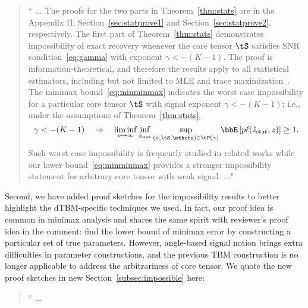\documentclass[11pt]{article}
\theoremstyle{definition}
\theoremstyle{definition}
\begin{document}
\begin{enumerate}
\begin{enumerate}[wide]
    \begin{quote}
        `` ...
        The proofs for the two parts in Theorem~\ref{thm:stats} are in the Appendix II, Section~\ref{sec:statprove1} and Section~\ref{sec:statprove2}, respectively. The first part of Theorem~\ref{thm:stats} demonstrates impossibility of exact recovery whenever the core tensor $\tS$ satisfies SNR condition~\eqref{eq:gamma} with exponent $\gamma < -(K-1)$. The proof is information-theoretical, and therefore the results apply to all statistical estimators, including but not limited to MLE and trace maximization~\citep{ghoshdastidar2017uniform}. The minimax bound~\eqref{eq:minminmax} indicates the worst case impossibility for a particular core tensor $\tS$ with signal exponent $\gamma < -(K-1)$; i.e., under the assumptions of Theorem~\ref{thm:stats}, 
\begin{equation}
    \gamma < -(K-1) \quad \Rightarrow \quad \liminf_{p \rightarrow \infty}  \inf_{\hat z_{\text{stat}}}\sup_{ (z,\tS, \mtheta) \in \tP(\gamma)} \bbE \left[ p\ell(\hat z_{\text{stat}}, z) \right]\geq 1.
\end{equation}
Such worst case impossibility is frequently studied in related works \citep{han2020exact, gao2018community} while our lower bound~\eqref{eq:minminmax} provides a stronger impossibility statement for arbitrary core tensor with weak signal.   ..."
    \end{quote}
    
    Second, we have added proof sketches for the impossibility results to better highlight the dTBM-specific techniques we used. In fact, our proof idea is common in minimax analysis and shares the same spirit with reviewer's proof idea in the comment: find the lower bound of minimax error by constructing a particular set of true parameters. However, angle-based signal notion brings extra difficulties in parameter constructions, and the previous TBM construction is no longer applicable to address the arbitrariness of core tensor. We quote the new proof sketches in new Section~\ref{subsec:impossible} here:
    
    \begin{quote}
    `` ...
    

\end{quote}
\end{enumerate}
\end{enumerate}
\end{document}
